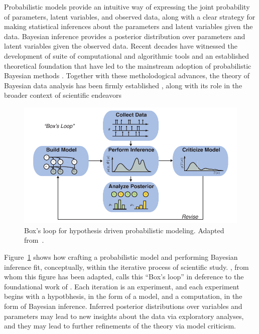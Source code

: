 Probabilistic models provide an intuitive way of expressing the
joint probability of parameters, latent variables, and observed 
data, along with a clear strategy for making statistical inferences 
about the parameters and latent variables given the data. Bayesian
inference provides a posterior distribution
 over parameters and latent variables given the observed data. 
Recent decades have witnessed the development of suite of computational 
and algorithmic tools and an established theoretical foundation 
that have led to the mainstream adoption of probabilistic Bayesian 
methods \cite{bishop2006pattern, murphy2012probabilistic}. Together with these
metholodogical advances, the theory of Bayesian data analysis 
has been firmly established \cite{gelman2014bayesian}, along with its role 
in the broader context of scientific endeavors \cite{gelman2013philosophy, blei2014build}


\begin{figure}[t]
  \centering%
\includegraphics[width=5.5in]{figures/ch1/boxloop} 
\caption[Box's Loop]{Box's loop for hypothesis driven probabilistic modeling.
Adapted from~\citet{blei2014build}.}
\label{fig:boxloop}
\end{figure}


Figure~\ref{fig:boxloop} shows how crafting a probabilistic model and
performing Bayesian inference fit, conceptually, within the iterative
process of scientific study. \citet{blei2014build}, from whom this
figure has been adapted, calls this ``Box's loop'' in deference to the
foundational work of \citet{box1980sampling}. Each iteration is an 
experiment, and each experiment begins with a hypotbhesis, in the 
form of a model, and a computation, in the form of Bayesian inference.
Inferred posterior distributions over variables and parameters may 
lead to new insights about the data via exploratory analyses, and 
they may lead to further refinements of the theory via model criticism.


